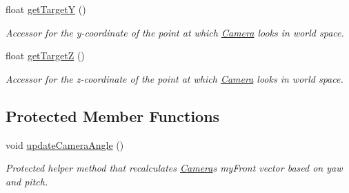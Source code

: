 \begin{DoxyCompactItemize}
float \hyperlink{classtsgl_1_1_camera_ac06e3f420e82af5189f525881191031b}{get\+TargetY} ()
\begin{DoxyCompactList}\small\item\em Accessor for the y-\/coordinate of the point at which \hyperlink{classtsgl_1_1_camera}{Camera} looks in world space. \end{DoxyCompactList}\item 
float \hyperlink{classtsgl_1_1_camera_a1ceef7ca9535c701c7c70741c1170dea}{get\+TargetZ} ()
\begin{DoxyCompactList}\small\item\em Accessor for the z-\/coordinate of the point at which \hyperlink{classtsgl_1_1_camera}{Camera} looks in world space. \end{DoxyCompactList}\end{DoxyCompactItemize}
\subsection*{Protected Member Functions}
\begin{DoxyCompactItemize}
\item 
void \hyperlink{classtsgl_1_1_camera_ac2daf561e3b110fe4ec17b23e530c01e}{update\+Camera\+Angle} ()
\begin{DoxyCompactList}\small\item\em Protected helper method that recalculates \hyperlink{classtsgl_1_1_camera}{Camera}\textquotesingle{}s my\+Front vector based on yaw and pitch. \end{DoxyCompactList}\end{DoxyCompactItemize}
